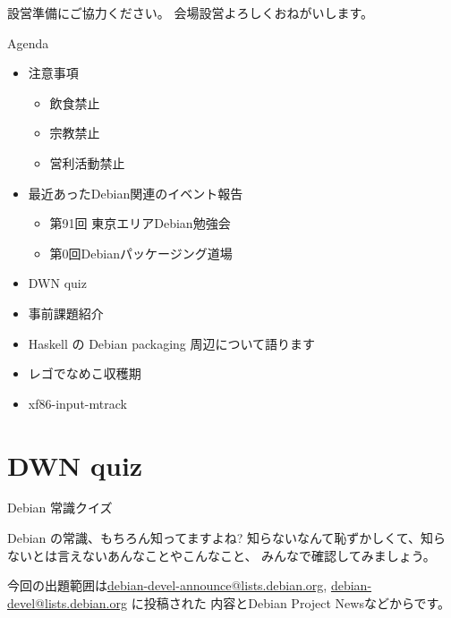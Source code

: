 \frame{\titlepage{}}

\begin{frame}{設営準備にご協力ください。}
会場設営よろしくおねがいします。
\end{frame}

\begin{frame}{Agenda}
\begin{minipage}[t]{0.45\hsize}
  \begin{itemize}
  \item 注意事項
	\begin{itemize}
	 \item 飲食禁止
	 \item 宗教禁止
	 \item 営利活動禁止
	\end{itemize}
   \item 最近あったDebian関連のイベント報告
	\begin{itemize}
        \item 第91回 東京エリアDebian勉強会
        \item 第0回Debianパッケージング道場
	\end{itemize}
   \item DWN quiz
   \item 事前課題紹介
 \end{itemize}
\end{minipage} 
\begin{minipage}[t]{0.45\hsize}
 \begin{itemize}
  \item Haskell の Debian packaging 周辺について語ります
  \item レゴでなめこ収穫期
  \item xf86-input-mtrack

 \end{itemize}
\end{minipage}
\end{frame}


\section{DWN quiz}
\begin{frame}{Debian 常識クイズ}

Debian の常識、もちろん知ってますよね?
知らないなんて恥ずかしくて、知らないとは言えないあんなことやこんなこと、
みんなで確認してみましょう。

今回の出題範囲は\url{debian-devel-announce@lists.debian.org},
\url{debian-devel@lists.debian.org} に投稿された
内容とDebian Project Newsなどからです。

\end{frame}

